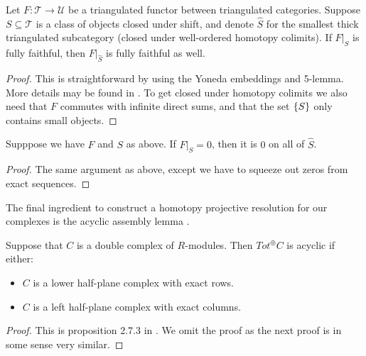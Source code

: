\documentclass[../thesis.tex]{subfiles}
\begin{document}
            \begin{lemma}[Devissage]
                Let $F: \mathcal{T} \rightarrow \mathcal{U}$ be a triangulated functor between triangulated categories. Suppose $S\subseteq \mathcal{T}$ is a class of objects closed under shift, and denote $\hat{S}$ for the smallest thick triangulated subcategory (closed under well-ordered homotopy colimits). If $F|_S$ is fully faithful, then $F|_{\hat{S}}$ is fully faithful as well.
            \end{lemma}

            \begin{proof}
                This is straightforward by using the Yoneda embeddings and 5-lemma. More details may be found in \cite{Krause21}. To get closed under homotopy colimits we also need that $F$ commutes with infinite direct sums, and that the set $\{S\}$ only contains small objects.
            \end{proof}

            \begin{lemma}
                Supppose we have $F$ and $S$ as above. If $F|_S = 0$, then it is $0$ on all of $\hat{S}$.
            \end{lemma}

            \begin{proof}
                The same argument as above, except we have to squeeze out zeros from exact sequences.
            \end{proof}

            The final ingredient to construct a homotopy projective resolution for our complexes is the acyclic assembly lemma \cite{Weibel94}.

            \begin{lemma}
                Suppose that $C$ is a double complex of $R$-modules. Then $Tot^\oplus C$ is acyclic if either:
                \begin{itemize}
                    \item $C$ is a lower half-plane complex with exact rows.
                    \item $C$ is a left half-plane complex with exact columns.
                \end{itemize}
            \end{lemma}

            \begin{proof}
                This is proposition 2.7.3 in \cite{Weibel94}. We omit the proof as the next proof is in some sense very similar.
            \end{proof}
\end{document}
